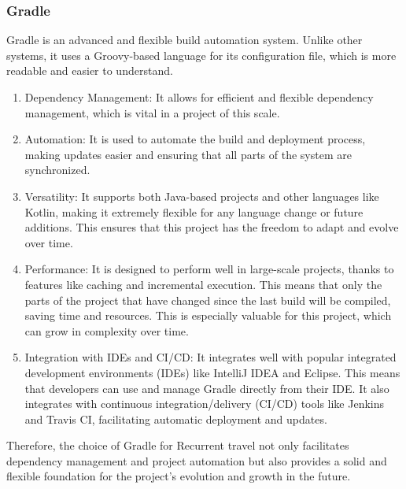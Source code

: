 \documentclass[../memory.tex]{subfiles}
\begin{document}
\subsubsection{Gradle}
Gradle is an advanced and flexible build automation system. Unlike other
systems, it uses a Groovy-based language for its configuration file, which is
more readable and easier to understand.
\begin{enumerate}[label = -]
	\item Dependency Management: It allows for efficient and flexible dependency
	      management, which is vital in a project of this scale.
	\item Automation: It is used to automate the build and deployment process,
	      making updates easier and ensuring that all parts of the system are
	      synchronized.
	\item Versatility: It supports both Java-based projects and other languages
	      like Kotlin, making it extremely flexible for any language change or future
	      additions. This ensures that this project has the freedom to adapt and
	      evolve over time.
	\item Performance: It is designed to perform well in large-scale projects,
	      thanks to features like caching and incremental execution. This means that
	      only the parts of the project that have changed since the last build will be
	      compiled, saving time and resources. This is especially valuable for this
	      project, which can grow in complexity over time.
	\item Integration with IDEs and CI/CD: It integrates well with popular
	      integrated development environments (IDEs) like IntelliJ IDEA and Eclipse.
	      This means that developers can use and manage Gradle directly from their IDE.
	      It also integrates with continuous integration/delivery (CI/CD) tools like
	      Jenkins and Travis CI, facilitating automatic deployment and updates.
\end{enumerate}
Therefore, the choice of Gradle for Recurrent travel not only facilitates
dependency management and project automation but also provides a solid and
flexible foundation for the project's evolution and growth in the future.
\end{document}
